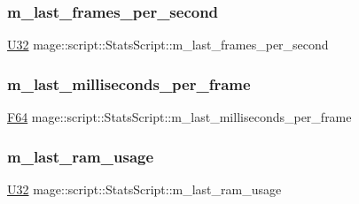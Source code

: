 \subsubsection{\texorpdfstring{m\+\_\+last\+\_\+frames\+\_\+per\+\_\+second}{m\_last\_frames\_per\_second}}
{\footnotesize\ttfamily \hyperlink{namespacemage_a41c104c036fba3756a74e19f793eeaa1}{U32} mage\+::script\+::\+Stats\+Script\+::m\+\_\+last\+\_\+frames\+\_\+per\+\_\+second\hspace{0.3cm}{\ttfamily [private]}}

\hypertarget{classmage_1_1script_1_1_stats_script_a6c531ad04b2fa2ce530af06914d362b9}{}\label{classmage_1_1script_1_1_stats_script_a6c531ad04b2fa2ce530af06914d362b9} 
\subsubsection{\texorpdfstring{m\+\_\+last\+\_\+milliseconds\+\_\+per\+\_\+frame}{m\_last\_milliseconds\_per\_frame}}
{\footnotesize\ttfamily \hyperlink{namespacemage_ad26233bbec640deda836e572c1a23708}{F64} mage\+::script\+::\+Stats\+Script\+::m\+\_\+last\+\_\+milliseconds\+\_\+per\+\_\+frame\hspace{0.3cm}{\ttfamily [private]}}

\hypertarget{classmage_1_1script_1_1_stats_script_a0ea0dcf90e4364af1f64d67024314a94}{}\label{classmage_1_1script_1_1_stats_script_a0ea0dcf90e4364af1f64d67024314a94} 
\subsubsection{\texorpdfstring{m\+\_\+last\+\_\+ram\+\_\+usage}{m\_last\_ram\_usage}}
{\footnotesize\ttfamily \hyperlink{namespacemage_a41c104c036fba3756a74e19f793eeaa1}{U32} mage\+::script\+::\+Stats\+Script\+::m\+\_\+last\+\_\+ram\+\_\+usage\hspace{0.3cm}{\ttfamily [private]}}

